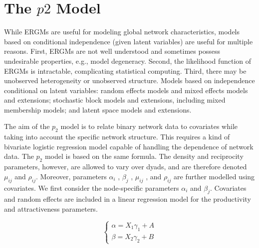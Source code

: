 \documentclass[12pt]{ociamthesis}  %
\begin{document}
	\section{The $p2$ Model}
	
	While ERGMs are useful for modeling global network characteristics, models based on conditional independence (given latent variables) are useful for multiple reasons. First, ERGMs are not well understood and sometimes possess undesirable properties, e.g., model degeneracy. Second, the likelihood function of ERGMs is intractable, complicating statistical computing. Third, there may be unobserved heterogeneity or unobserved structure.
	Models based on independence conditional on latent variables: random effects models and mixed effects models and extensions; stochastic block models and extensions, including mixed membership models; and latent space models and extensions.
	
	The aim of the $p_{2}$ model is to relate binary network data to covariates while taking into account the specific network structure. This requires a kind of bivariate logistic regression model capable of handling the dependence of network data.
	The $p_{2}$ model is based on the same formula. The density and reciprocity parameters, however, are allowed to vary over dyads, and are therefore denoted $\mu_{ij} $ and $\rho_{ij}$. Moreover, parameters $\alpha_{i}$ , $\beta_{j}$ , $\mu_{ij}$ , and $\rho_{ij}$ are further modelled using covariates.
	We first consider the node-specific parameters $\alpha_{i}$ and $\beta_{j}$. Covariates and random effects are included in a linear regression model for the productivity and attractiveness parameters.
	
	\begingroup
	\large
	\begin{equation}
	\begin{cases}
	\alpha = X_{1} \gamma_{1} + A \\
	\beta = X_{2} \gamma_{2} + B
	\end{cases}
	\end{equation}
	\endgroup
\end{document}
